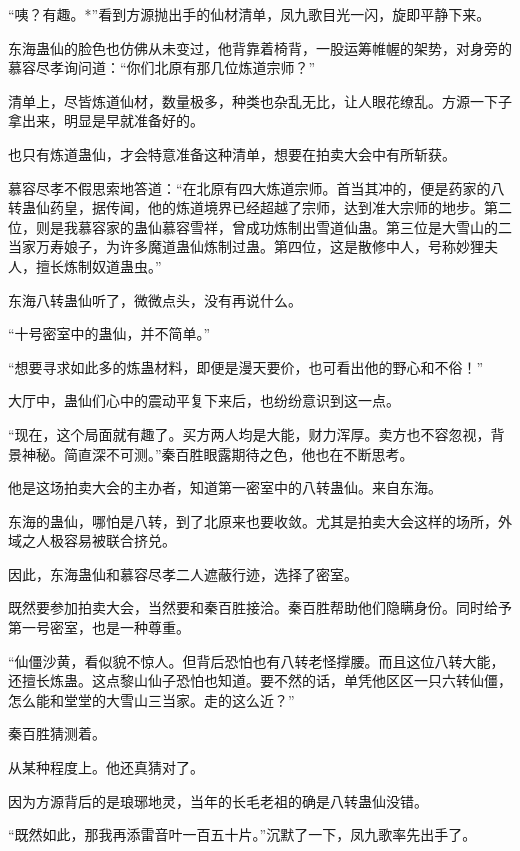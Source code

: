 
\begin{this_body}

“咦？有趣。*”看到方源抛出手的仙材清单，凤九歌目光一闪，旋即平静下来。

东海蛊仙的脸色也仿佛从未变过，他背靠着椅背，一股运筹帷幄的架势，对身旁的慕容尽孝询问道：“你们北原有那几位炼道宗师？”

清单上，尽皆炼道仙材，数量极多，种类也杂乱无比，让人眼花缭乱。方源一下子拿出来，明显是早就准备好的。

也只有炼道蛊仙，才会特意准备这种清单，想要在拍卖大会中有所斩获。

慕容尽孝不假思索地答道：“在北原有四大炼道宗师。首当其冲的，便是药家的八转蛊仙药皇，据传闻，他的炼道境界已经超越了宗师，达到准大宗师的地步。第二位，则是我慕容家的蛊仙慕容雪祥，曾成功炼制出雪道仙蛊。第三位是大雪山的二当家万寿娘子，为许多魔道蛊仙炼制过蛊。第四位，这是散修中人，号称妙狸夫人，擅长炼制奴道蛊虫。”

东海八转蛊仙听了，微微点头，没有再说什么。

“十号密室中的蛊仙，并不简单。”

“想要寻求如此多的炼蛊材料，即便是漫天要价，也可看出他的野心和不俗！”

大厅中，蛊仙们心中的震动平复下来后，也纷纷意识到这一点。

“现在，这个局面就有趣了。买方两人均是大能，财力浑厚。卖方也不容忽视，背景神秘。简直深不可测。”秦百胜眼露期待之色，他也在不断思考。

他是这场拍卖大会的主办者，知道第一密室中的八转蛊仙。来自东海。

东海的蛊仙，哪怕是八转，到了北原来也要收敛。尤其是拍卖大会这样的场所，外域之人极容易被联合挤兑。

因此，东海蛊仙和慕容尽孝二人遮蔽行迹，选择了密室。

既然要参加拍卖大会，当然要和秦百胜接洽。秦百胜帮助他们隐瞒身份。同时给予第一号密室，也是一种尊重。

“仙僵沙黄，看似貌不惊人。但背后恐怕也有八转老怪撑腰。而且这位八转大能，还擅长炼蛊。这点黎山仙子恐怕也知道。要不然的话，单凭他区区一只六转仙僵，怎么能和堂堂的大雪山三当家。走的这么近？”

秦百胜猜测着。

从某种程度上。他还真猜对了。

因为方源背后的是琅琊地灵，当年的长毛老祖的确是八转蛊仙没错。

“既然如此，那我再添雷音叶一百五十片。”沉默了一下，凤九歌率先出手了。


\end{this_body}

